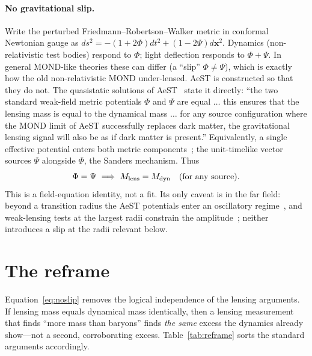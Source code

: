 \documentclass[aps,prd,twocolumn,10pt,nofootinbib,superscriptaddress]{revtex4-2}
\begin{document}
\paragraph{No gravitational slip.} Write the perturbed Friedmann--Robertson--Walker metric in conformal Newtonian
gauge as $ds^2=-(1+2\Phi)dt^2+(1-2\Psi)d\mathbf{x}^2$. Dynamics (non-relativistic test bodies) respond to $\Phi$;
light deflection responds to $\Phi+\Psi$. In general MOND-like theories these can differ (a ``slip'' $\Phi\neq\Psi$),
which is exactly how the old non-relativistic MOND under-lensed. AeST is constructed so that they do not. The
quasistatic solutions of AeST~\cite{Verwayen2024} state it directly: ``the two standard weak-field metric potentials
$\Phi$ and $\Psi$ are equal $\ldots$ this ensures that the lensing mass is equal to the dynamical mass $\ldots$ for
any source configuration where the MOND limit of AeST successfully replaces dark matter, the gravitational lensing
signal will also be as if dark matter is present.'' Equivalently, a single effective potential enters both metric
components~\cite{Mistele2023}; the unit-timelike vector sources $\Psi$ alongside $\Phi$, the Sanders mechanism. Thus
\begin{equation}
\Phi=\Psi\ \Longrightarrow\ M_{\rm lens}=M_{\rm dyn}\quad\text{(for any source).}
\label{eq:noslip}
\end{equation}
This is a field-equation identity, not a fit. Its only caveat is in the far field: beyond a transition radius the AeST
potentials enter an oscillatory regime~\cite{Verwayen2024}, and weak-lensing tests at the largest radii constrain the
amplitude~\cite{Mistele2023}; neither introduces a slip at the radii relevant below.

\section{The reframe}
Equation~\eqref{eq:noslip} removes the logical independence of the lensing arguments. If lensing mass equals dynamical
mass identically, then a lensing measurement that finds ``more mass than baryons'' finds \emph{the same} excess the
dynamics already show---not a second, corroborating excess. Table~\ref{tab:reframe} sorts the standard arguments
accordingly.
\end{document}
